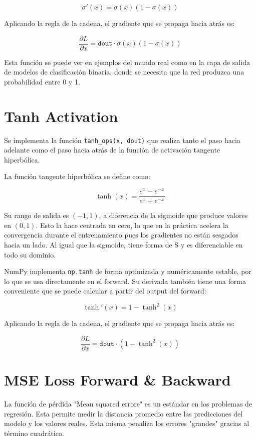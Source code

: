 \documentclass[12pt, letterpaper]{article}
\begin{document}
\[
\sigma'(x) = \sigma(x)(1 - \sigma(x))
\]

Aplicando la regla de la cadena, el gradiente que se propaga hacia atrás es:

\[
\frac{\partial L}{\partial x} = \texttt{dout} \cdot \sigma(x)(1 - \sigma(x))
\]

Esta función se puede ver en ejemplos del mundo real como en la capa de salida
de modelos de clasificación binaria, donde se necesita que la red produzca una
probabilidad entre 0 y 1.


\newpage

\section{Tanh Activation}

Se implementa la función \texttt{tanh\_ops(x, dout)} que realiza tanto el paso
hacia adelante como el paso hacia atrás de la función de activación tangente
hiperbólica.

La función tangente hiperbólica se define como:

\[
\tanh(x) = \frac{e^x - e^{-x}}{e^x + e^{-x}}
\]

Su rango de salida es $(-1, 1)$, a diferencia de la sigmoide que produce valores
en $(0,1)$. Esto la hace centrada en cero, lo que en la práctica acelera la
convergencia durante el entrenamiento pues los gradientes no están sesgados hacia
un lado. Al igual que la sigmoide, tiene forma de S y es diferenciable en todo
su dominio.

NumPy implementa \texttt{np.tanh} de forma optimizada y numéricamente estable,
por lo que se usa directamente en el forward. Su derivada también tiene una forma
conveniente que se puede calcular a partir del output del forward:

\[
\tanh'(x) = 1 - \tanh^2(x)
\]

Aplicando la regla de la cadena, el gradiente que se propaga hacia atrás es:

\[
\frac{\partial L}{\partial x} = \texttt{dout} \cdot (1 - \tanh^2(x))
\]


\newpage

\section{MSE Loss Forward \& Backward}

La función de pérdida "Mean squared errore" es un estándar en los problemas de regresión. 
Esta permite medir la distancia promedio entre las predicciones del modelo y los valores reales. 
Esta misma penaliza los errores "grandes" gracias al término cuadrático.
\end{document}
